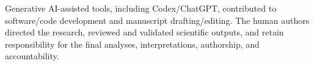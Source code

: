 Generative AI-assisted tools, including Codex/ChatGPT, contributed to software/code development and manuscript drafting/editing. The human authors directed the research, reviewed and validated scientific outputs, and retain responsibility for the final analyses, interpretations, authorship, and accountability.